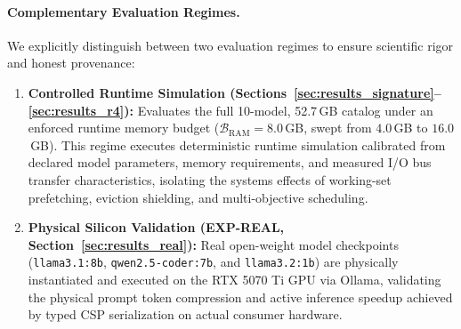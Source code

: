 \paragraph{Complementary Evaluation Regimes.}
We explicitly distinguish between two evaluation regimes to ensure scientific rigor and honest provenance:
\begin{enumerate}
    \item \textbf{Controlled Runtime Simulation (Sections~\ref{sec:results_signature}--\ref{sec:results_r4}):} Evaluates the full 10-model, 52.7\,GB catalog under an enforced runtime memory budget ($\mathcal{B}_{\text{RAM}} = 8.0$\,GB, swept from $4.0$\,GB to $16.0$\,GB). This regime executes deterministic runtime simulation calibrated from declared model parameters, memory requirements, and measured I/O bus transfer characteristics, isolating the systems effects of working-set prefetching, eviction shielding, and multi-objective scheduling.
    \item \textbf{Physical Silicon Validation (EXP-REAL, Section~\ref{sec:results_real}):} Real open-weight model checkpoints (\texttt{llama3.1:8b}, \texttt{qwen2.5-coder:7b}, and \texttt{llama3.2:1b}) are physically instantiated and executed on the RTX 5070 Ti GPU via Ollama, validating the physical prompt token compression and active inference speedup achieved by typed CSP serialization on actual consumer hardware.
\end{enumerate}

